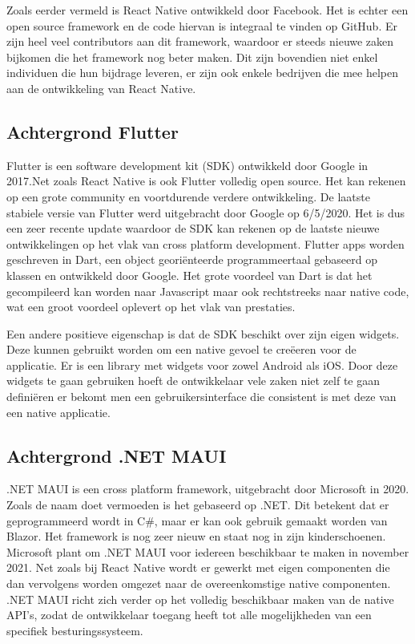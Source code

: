 Zoals eerder vermeld is React Native ontwikkeld door Facebook. Het is echter een open source framework en de code hiervan is integraal te vinden op GitHub. Er zijn heel veel contributors aan dit framework, waardoor er steeds nieuwe zaken bijkomen die het framework nog beter maken. Dit zijn bovendien niet enkel individuen die hun bijdrage leveren, er zijn ook enkele bedrijven die mee helpen aan de ontwikkeling van React Native.

\subsection{Achtergrond Flutter}

Flutter is een software development kit (SDK) ontwikkeld door Google in 2017.Net zoals React Native is ook Flutter volledig open source. Het kan rekenen op een grote community en voortdurende verdere ontwikkeling. De laatste stabiele versie van Flutter werd uitgebracht door Google op 6/5/2020. Het is dus een zeer recente update waardoor de SDK kan rekenen op de laatste nieuwe ontwikkelingen op het vlak van cross platform development. Flutter apps worden geschreven in Dart, een object georiënteerde programmeertaal gebaseerd op klassen en ontwikkeld door Google. Het grote voordeel van Dart is dat het gecompileerd kan worden naar Javascript maar ook rechtstreeks naar native code, wat een groot voordeel oplevert op het vlak van prestaties. 

Een andere positieve eigenschap is dat de SDK beschikt over zijn eigen widgets. Deze kunnen gebruikt worden om een native gevoel te creëeren voor de applicatie. Er is een library met widgets voor zowel Android als iOS. Door deze widgets te gaan gebruiken hoeft de ontwikkelaar vele zaken niet zelf te gaan definiëren er bekomt men een gebruikersinterface die consistent is met deze van een native applicatie. 

\subsection{Achtergrond .NET MAUI}

.NET MAUI is een cross platform framework, uitgebracht door Microsoft in 2020. Zoals de naam doet vermoeden is het gebaseerd op .NET. Dit betekent dat er geprogrammeerd wordt in C\#, maar er kan ook gebruik gemaakt worden van Blazor. Het framework is nog zeer nieuw en staat nog in zijn kinderschoenen. Microsoft plant om .NET MAUI voor iedereen beschikbaar te maken in november 2021. Net zoals bij React Native wordt er gewerkt met eigen componenten die dan vervolgens worden omgezet naar de overeenkomstige native componenten. .NET MAUI richt zich verder op het volledig beschikbaar maken van de native API's, zodat de ontwikkelaar toegang heeft tot alle mogelijkheden van een specifiek besturingssysteem. 

